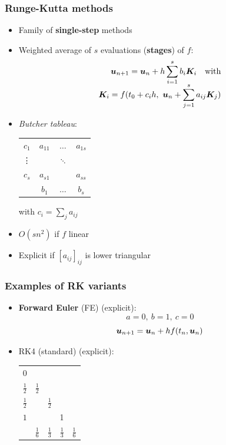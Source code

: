 \documentclass{beamer}
\begin{document}
\begin{frame} %
	\frametitle{Runge-Kutta methods}
	\begin{itemize}
		\item Family of \textbf{single-step} methods
		\item Weighted average of $s$ evaluations (\textbf{stages}) of $f$: \\[-20pt]
		\begin{align*}
			\boldsymbol u_{n+1} = \boldsymbol u_{n} + h \sum_{i=1}^s b_i \boldsymbol K_i \quad \text{with} \\[-5pt]
			\boldsymbol K_i = f(t_0 + c_i h, \ \boldsymbol u_n + \sum_{j=1}^s a_{ij} \boldsymbol K_j)
		\end{align*}
		\pause
		\vspace{-20pt}
		\item \textit{Butcher tableau}:
		\begin{center}
			\begin{tabular}{c|ccc}
				$c_1$ & $a_{11}$ & $\dots$ & $a_{1s}$ \\
				\vdots & & $\ddots$ & \\
				$c_s$ & $a_{s1}$ & & $a_{ss}$ \\
				\hline
				& $b_1$ & $\dots$ & $b_s$
			\end{tabular}
		\hspace{30pt} with $c_i = \sum_j a_{ij}$
		\pause
		\end{center}
		\item $O(s n^2)$ if $f$ linear
		\item Explicit if $[a_{ij}]_{ij}$ is lower triangular
	\end{itemize}
\end{frame}


\begin{frame} %
	\frametitle{Examples of RK variants}
	\begin{itemize}
		\item \textbf{Forward Euler} (FE) (explicit):
		$$ a = 0, \ b = 1, \ c = 0 $$
		$$ \boldsymbol u_{n+1} = \boldsymbol u_{n} + h f(t_n, \boldsymbol u_n) $$
		\item RK4 (standard) (explicit): \\
		\begin{center}
			\begin{tabular}{c|cccc}
				$0$ & & & & \\
				$\frac 1 2$ & $\frac 1 2$ & & & \\
				$\frac 1 2$ & & $\frac 1 2$ & & \\
				$1$ & & & 1 & \\
				\hline
				& $\frac 1 6$ & $\frac 1 3$ & $\frac 1 3$ & $\frac 1 6$
				\end{tabular}
		\end{center}	
	\end{itemize}
\end{frame}
\end{document}
